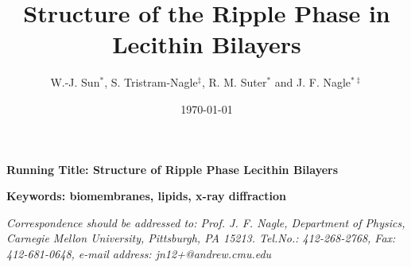 
\draft
\title{Structure of the Ripple Phase in Lecithin Bilayers}
\author {W.-J. Sun$^{*}$, S. Tristram-Nagle$^{\ddag}$, R. M. Suter$^{*}$ 
and J. F.  Nagle$^{* \ddag}$}
\address{Department of Physics$^{*}$ and Department of Biological 
Sciences$^{\ddag}$, \protect\\ Carnegie Mellon University , 
Pittsburgh, PA 15213 }
\date{\today}
\maketitle
\vspace{1 in}
\begin{center}
\textbf{Running Title: Structure of Ripple Phase 
Lecithin Bilayers}\\ 
\end{center}
\vspace{1 in}
\begin{center}
\textbf{Keywords: biomembranes, lipids, x-ray diffraction}
\end{center}
\vspace{1 in}

\noindent
\textit{Correspondence should be addressed to:  Prof. J. F. Nagle, 
Department of Physics, Carnegie Mellon University, Pittsburgh, PA 15213.  
Tel.No.: 412-268-2768, Fax: 412-681-0648, e-mail address: 
jn12+@andrew.cmu.edu}
\newpage
